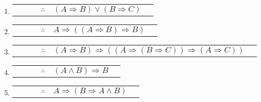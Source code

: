 \documentclass[12pt]{report}
\theoremstyle{largebreak}
\newcounter{tablec}
\begin{document}
\begin{sol}
\begin{enumerate}
\begin{center}
\begin{tabular}{l r l c l r}
                \end{tabular}
            \end{center}
            \item
            \begin{center}
                \setcounter{tablec}{1}
                \begin{tabular}{l r l c l r}
                    \hline
                    & & & $\therefore$ & $(A\Rightarrow B)\lor (B\Rightarrow C)$ & \\
                \end{tabular}
            \end{center}
            \item
            \begin{center}
                \setcounter{tablec}{1}
                \begin{tabular}{l r l c l r}
                    \hline
                    & & & $\therefore$ & $A\Rightarrow ((A\Rightarrow B)\Rightarrow B)$ & \\
                \end{tabular}
            \end{center}
            \item
            \begin{center}
                \begin{tabular}{l r l c l r}
                    \hline
                    & & & $\therefore$ & $(A\Rightarrow B)\Rightarrow((A\Rightarrow (B\Rightarrow C))\Rightarrow(A\Rightarrow C))$ & \\
                \end{tabular}
            \end{center}
            \item
            \begin{center}
                \setcounter{tablec}{1}
                \begin{tabular}{l r l c l r}
                    \hline
                    & & & $\therefore$ & $(A\land B)\Rightarrow B$ & \\
                \end{tabular}
            \end{center}
            \item
            \begin{center}
                \setcounter{tablec}{1}
                \begin{tabular}{l r l c l r}
                    \hline
                    & & & $\therefore$ & $A\Rightarrow(B\Rightarrow A\land B)$ & \\
                \end{tabular}
            \end{center}
        \end{enumerate}
    \end{sol}
\end{document}
